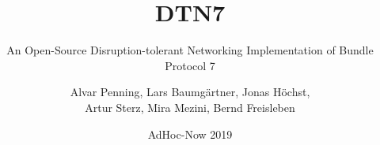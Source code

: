 \documentclass[usenames,dvipsnames]{beamer}
\title{DTN7}
\subtitle{An Open-Source Disruption-tolerant Networking Implementation of Bundle Protocol 7}
\author{Alvar Penning, Lars Baumgärtner, Jonas Höchst,\\
  Artur Sterz, Mira Mezini, Bernd Freisleben}
\date{AdHoc-Now 2019}
\begin{document}
\begin{frame}
  \titlepage
\end{frame}







\end{document}
